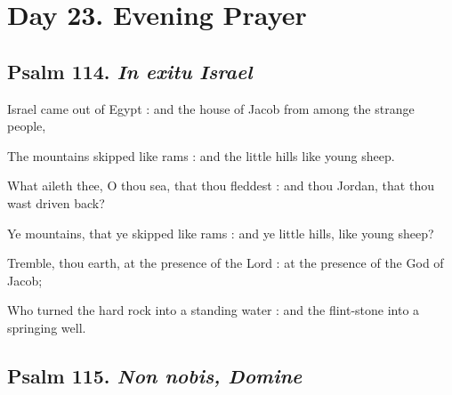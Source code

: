 \section*{Day 23. Evening Prayer}

\subsection{Psalm 114. \textit{In exitu Israel}}

 Israel came out of Egypt : and the house of Jacob from among the strange people,\par
{}
The mountains skipped like rams : and the little hills like young sheep.\par
{}What aileth thee, O thou sea, that thou fleddest : and thou Jordan, that thou wast driven back?\par
{}Ye mountains, that ye skipped like rams : and ye little hills, like young sheep?\par
{}Tremble, thou earth, at the presence of the Lord : at the presence of the God of Jacob;\par
{}Who turned the hard rock into a standing water : and the flint-stone into a springing well.\par

\subsection{Psalm 115. \textit{Non nobis, Domine}}


